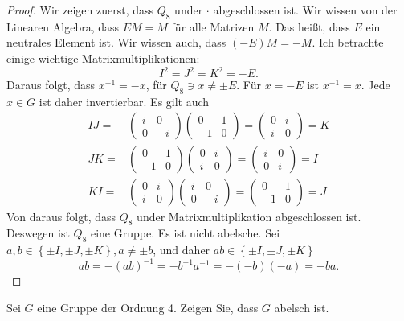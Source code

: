 \begin{proof}
	Wir zeigen zuerst, dass $Q_8$ under $\cdot$ abgeschlossen ist. Wir wissen von der Linearen Algebra, dass $EM=M$ f\"{u}r alle Matrizen $M$. Das heißt, dass $E$ ein neutrales Element ist. Wir wissen auch, dass $(-E)M=-M$. Ich betrachte einige wichtige Matrixmultiplikationen:
	\[
	I^2=J^2=K^2=-E
	.\]
	Daraus folgt, dass $x^{-1}=-x$, f\"{u}r $Q_8\ni x \neq \pm E$. F\"{u}r $x=-E$ ist $x^{-1}=x$. Jede $x\in G$ ist daher invertierbar.
	Es gilt auch
	\begin{align*}
		IJ=&\begin{pmatrix} i & 0 \\ 0 & -i \end{pmatrix} \begin{pmatrix} 0 & 1 \\ -1 & 0 \end{pmatrix} =\begin{pmatrix} 0 & i \\ i & 0 \end{pmatrix}=K\\
		JK=&\begin{pmatrix} 0 & 1 \\ -1 & 0 \end{pmatrix} \begin{pmatrix} 0 & i \\ i & 0 \end{pmatrix} =\begin{pmatrix} i & 0 \\ 0 & i \end{pmatrix}=I\\
		KI=&\begin{pmatrix} 0 & i\\i & 0 \end{pmatrix} \begin{pmatrix} i & 0 \\ 0 & -i \end{pmatrix}=\begin{pmatrix} 0 & 1 \\ -1 & 0 \end{pmatrix} =J
	\end{align*}
	Von daraus folgt, dass $Q_8$ under Matrixmultiplikation abgeschlossen ist. Deswegen ist $Q_8$ eine Gruppe. Es ist nicht abelsche. Sei $a,b\in \left\{ \pm I, \pm J, \pm K \right\}, a\neq \pm b$, und daher $ab\in \left\{ \pm I, \pm J, \pm K \right\} $ 
	\[
	ab=-(ab)^{-1}=-b^{-1}a^{-1}=-(-b)(-a)=-ba
	.\] 
\end{proof}
\begin{Problem}
	Sei $G$ eine Gruppe der Ordnung 4. Zeigen Sie, dass $G$ abelsch ist.
\end{Problem}
